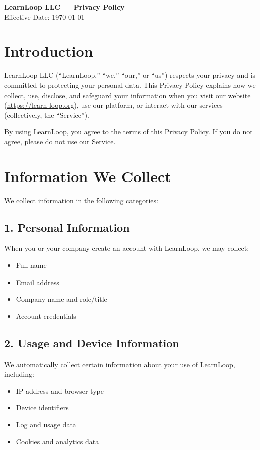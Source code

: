 \documentclass[12pt]{article}
\begin{document}
\begin{center}
    \Large{\textbf{LearnLoop LLC — Privacy Policy}} \\[0.3em]
    \normalsize{Effective Date: \today} \\[1em]
\end{center}

\onehalfspacing

\section{Introduction}
LearnLoop LLC (“LearnLoop,” “we,” “our,” or “us”) respects your privacy and is committed to protecting your personal data. This Privacy Policy explains how we collect, use, disclose, and safeguard your information when you visit our website (\href{https://learn-loop.org}{https://learn-loop.org}), use our platform, or interact with our services (collectively, the “Service”).

By using LearnLoop, you agree to the terms of this Privacy Policy. If you do not agree, please do not use our Service.

\section{Information We Collect}
We collect information in the following categories:

\subsection{1. Personal Information}
When you or your company create an account with LearnLoop, we may collect:
\begin{itemize}[leftmargin=*]
    \item Full name
    \item Email address
    \item Company name and role/title
    \item Account credentials
\end{itemize}

\subsection{2. Usage and Device Information}
We automatically collect certain information about your use of LearnLoop, including:
\begin{itemize}[leftmargin=*]
    \item IP address and browser type
    \item Device identifiers
    \item Log and usage data
    \item Cookies and analytics data
\end{itemize}
\end{document}
